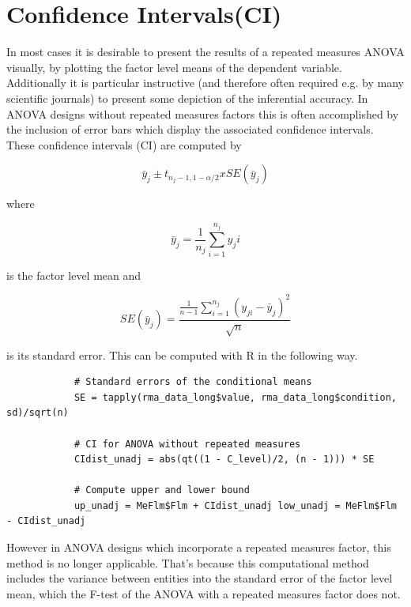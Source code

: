\documentclass[11pt]{article}
\begin{document}
		
		
	\section{Confidence Intervals(CI)}
		In most cases it is desirable to present the results of a repeated measures ANOVA visually, by plotting the factor level means of the dependent variable. Additionally it is particular instructive (and therefore often required e.g. by many scientific journals) to present some depiction of the inferential accuracy. In ANOVA designs without repeated measures factors this is often accomplished by the inclusion of error bars which display the associated confidence intervals. These confidence intervals (CI) are computed by
		
		\begin{equation}
			\bar{y}_j \pm t_{n_j - 1,1-\alpha/2 } x SE(\bar{y}_j)
		\end{equation}
		
		where 
		
		\begin{equation}
			\bar{y}_j = \frac{1}{n_j}\sum_{i=1}^{n_j}y_ji
		\end{equation}
		
		is the factor level mean and
		
		\begin{equation}
			SE(\bar{y}_j) = \frac{\frac{1}{n-1}\sum_{i=1}^{n_j}(y_{ji}-\bar{y}_j)^2}{\sqrt{n}}
		\end{equation}
		
		is its standard error. This can be computed with R in the following way.\\
		
		\begin{lstlisting}
			# Standard errors of the conditional means 
			SE = tapply(rma_data_long$value, rma_data_long$condition, sd)/sqrt(n)
			
			# CI for ANOVA without repeated measures 
			CIdist_unadj = abs(qt((1 - C_level)/2, (n - 1))) * SE
			
			# Compute upper and lower bound 
			up_unadj = MeFlm$Flm + CIdist_unadj low_unadj = MeFlm$Flm - CIdist_unadj
		\end{lstlisting}
		
		However in ANOVA designs which incorporate a repeated measures factor, this method is no longer applicable. That’s because this computational method includes the variance between entities into the standard error of the factor level mean, which the F-test of the ANOVA with a repeated measures factor does not.\\
		
\end{document}
